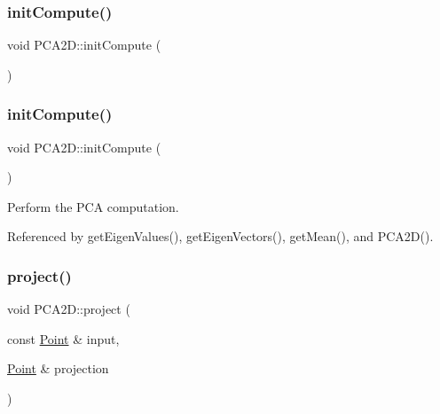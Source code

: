 \mbox{\label{classPCA2D_a80df2e612db722f630d4c48a9a71f651}} 
\subsubsection{\texorpdfstring{init\+Compute()}{initCompute()}\hspace{0.1cm}{\footnotesize\ttfamily [1/2]}}
{\footnotesize\ttfamily void P\+C\+A2\+D\+::init\+Compute (\begin{DoxyParamCaption}{ }\end{DoxyParamCaption})\hspace{0.3cm}{\ttfamily [inline]}}

\mbox{\label{classPCA2D_a80df2e612db722f630d4c48a9a71f651}} 
\subsubsection{\texorpdfstring{init\+Compute()}{initCompute()}\hspace{0.1cm}{\footnotesize\ttfamily [2/2]}}
{\footnotesize\ttfamily void P\+C\+A2\+D\+::init\+Compute (\begin{DoxyParamCaption}{ }\end{DoxyParamCaption})}



Perform the P\+CA computation. 



Referenced by get\+Eigen\+Values(), get\+Eigen\+Vectors(), get\+Mean(), and P\+C\+A2\+D().

\mbox{\label{classPCA2D_a9768dbce5a3b9cd0b3aacbedc3301884}} 
\subsubsection{\texorpdfstring{project()}{project()}\hspace{0.1cm}{\footnotesize\ttfamily [1/4]}}
{\footnotesize\ttfamily void P\+C\+A2\+D\+::project (\begin{DoxyParamCaption}\item[{const \hyperlink{Normal2dEstimation_8h_ab8d898f36957cca40634530a6f118a3e}{Point} \&}]{input,  }\item[{\hyperlink{Normal2dEstimation_8h_ab8d898f36957cca40634530a6f118a3e}{Point} \&}]{projection }\end{DoxyParamCaption})}



